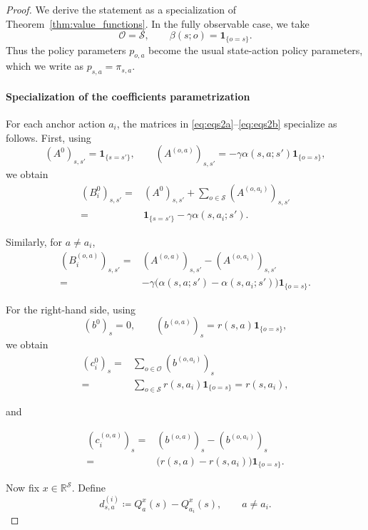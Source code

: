 \documentclass{article}
\theoremstyle{definition}
\theoremstyle{remark}
\begin{document}
\begin{proof}
We derive the statement as a specialization of Theorem~\ref{thm:value_functions}. In the fully observable case, we take
\[
    \mathcal O=\mathcal S,
    \qquad
    \beta(s;o)=\mathbf 1_{\{o=s\}}.
\]
Thus the policy parameters $p_{o,a}$ become the usual state-action policy parameters, which we write as $p_{s,a}=\pi_{s,a}$.

\paragraph{Specialization of the coefficients parametrization} 
For each anchor action $a_i$, the matrices in \eqref{eq:eqs2a}--\eqref{eq:eqs2b} specialize as follows. First,  using 
$$
(A^0)_{s,s'}=\mathbf 1_{\{s=s'\}},
    \qquad
    (A^{(o,a)})_{s,s'}
    =
    -\gamma\alpha(s,a;s')\mathbf 1_{\{o=s\}} , 
$$    
we obtain 
\begin{align*} 
    (B_i^0)_{s,s'}
    =& 
    (A^0)_{s,s'}
    +
    \sum_{o\in\mathcal S}
    (A^{(o,a_i)})_{s,s'} \\
    =& 
    \mathbf 1_{\{s=s'\}}
    -
    \gamma\alpha(s,a_i;s') . 
\end{align*} 

Similarly, for $a\neq a_i$,
\begin{align*} 
    (B_i^{(o,a)})_{s,s'} =& (A^{(o,a)})_{s,s'} - (A^{(o,a_i)})_{s,s'} \\
    =&  -\gamma \bigl( \alpha(s,a;s')-\alpha(s,a_i;s') \bigr) \mathbf 1_{\{o=s\}}.
\end{align*} 

For the right-hand side, using 
$$
(b^{0})_s = 0, \qquad (b^{(o,a)})_s = r(s,a) \mathbf 1_{\{o=s\}} , 
$$
we obtain 
\begin{align*} 
    (c_i^0)_s
    =& \sum_{o\in\mathcal O} (b^{(o,a_i)})_s \\
    =& \sum_{o\in\mathcal S} r(s,a_i)\mathbf 1_{\{o=s\}} = r(s,a_i),
\end{align*} 

and

\begin{align*} 
    (c_i^{(o,a)})_s
        =& (b^{(o,a)})_s - (b^{(o,a_i)})_s\\
        =& \bigl(r(s,a)-r(s,a_i)\bigr)\mathbf 1_{\{o=s\}}.
\end{align*} 

Now fix $x\in\mathbb R^{\mathcal S}$. Define
\[
    d_{s,a}^{(i)}
    \coloneqq
    Q_a^x(s)-Q_{a_i}^x(s),
    \qquad a\neq a_i.
\]


\end{proof}
\end{document}
